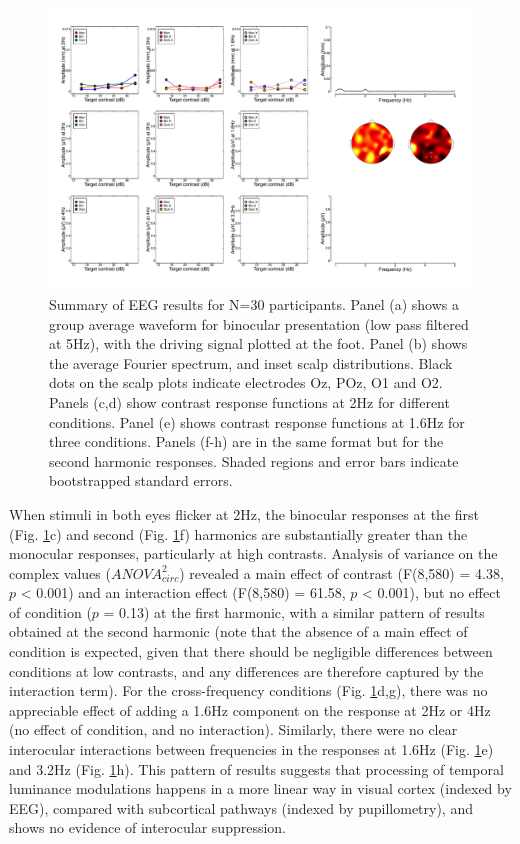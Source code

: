 \documentclass[
]{article}
\begin{document}
\begin{figure}

{\centering \includegraphics{Figures/blank} 

}

\caption{Summary of EEG results for N=30 participants. Panel (a) shows a group average waveform for binocular presentation (low pass filtered at 5Hz), with the driving signal plotted at the foot. Panel (b) shows the average Fourier spectrum, and inset scalp distributions. Black dots on the scalp plots indicate electrodes Oz, POz, O1 and O2. Panels (c,d) show contrast response functions at 2Hz for different conditions. Panel (e) shows contrast response functions at 1.6Hz for three conditions. Panels (f-h) are in the same format but for the second harmonic responses. Shaded regions and error bars indicate bootstrapped standard errors.}\label{fig:EEGdata}
\end{figure}

When stimuli in both eyes flicker at 2Hz, the binocular responses at the first (Fig. \ref{fig:EEGdata}c) and second (Fig. \ref{fig:EEGdata}f) harmonics are substantially greater than the monocular responses, particularly at high contrasts. Analysis of variance on the complex values (\(ANOVA^2_{circ}\)) revealed a main effect of contrast (F(8,580) = 4.38, \(p\) \textless{} 0.001) and an interaction effect (F(8,580) = 61.58, \(p\) \textless{} 0.001), but no effect of condition (\(p\) = 0.13) at the first harmonic, with a similar pattern of results obtained at the second harmonic (note that the absence of a main effect of condition is expected, given that there should be negligible differences between conditions at low contrasts, and any differences are therefore captured by the interaction term). For the cross-frequency conditions (Fig. \ref{fig:EEGdata}d,g), there was no appreciable effect of adding a 1.6Hz component on the response at 2Hz or 4Hz (no effect of condition, and no interaction). Similarly, there were no clear interocular interactions between frequencies in the responses at 1.6Hz (Fig. \ref{fig:EEGdata}e) and 3.2Hz (Fig. \ref{fig:EEGdata}h). This pattern of results suggests that processing of temporal luminance modulations happens in a more linear way in visual cortex (indexed by EEG), compared with subcortical pathways (indexed by pupillometry), and shows no evidence of interocular suppression.
\end{document}
